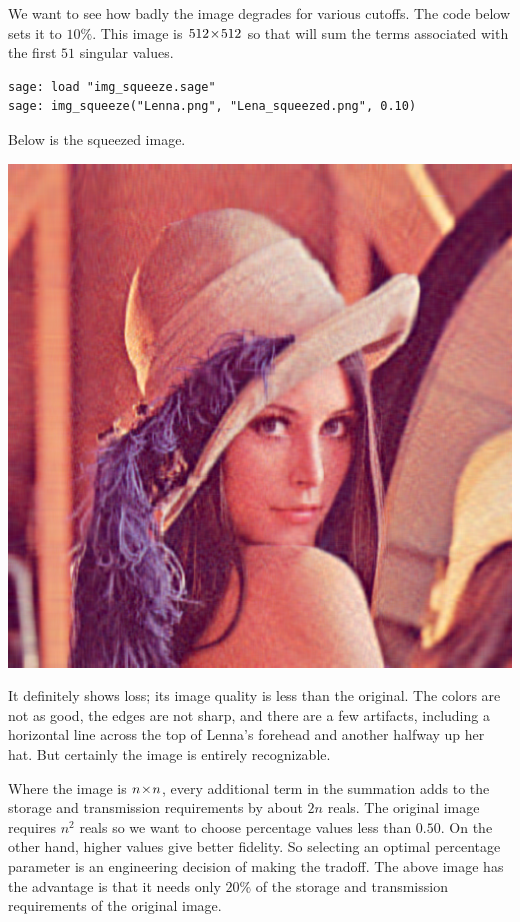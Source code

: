 We want to see how badly the image degrades for various cutoffs.
The code below sets it to $10\%$.
This image is $512 \! \times \! 512$  so that will sum the terms associated
with the first $51$ singular 
values.
\begin{lstlisting}
sage: load "img_squeeze.sage"                                 
sage: img_squeeze("Lenna.png", "Lena_squeezed.png", 0.10)
\end{lstlisting}
Below is the squeezed image.
\begin{center}
  \includegraphics[width=.95\textwidth]{Lena_squeezed.png}
\end{center}
It definitely shows loss;
its image quality is less than the original.
The colors are not as good, the edges are not sharp, and there are 
a few artifacts, including a horizontal line across the top of 
Lenna's forehead and another halfway up her hat.
But certainly the image is entirely recognizable.

Where the image is $n \! \times \! n$, every additional term in the summation
adds to the storage and transmission requirements by about $2n$ reals.
The original image requires $n^2$ reals so we want to choose percentage values 
less than $0.50$.
On the other hand, higher values give better fidelity.
So selecting an optimal percentage parameter is an engineering decision
of making the tradoff.
The above image has the advantage is that it needs only $20\%$ of the storage
and transmission requirements of the original image.
 
